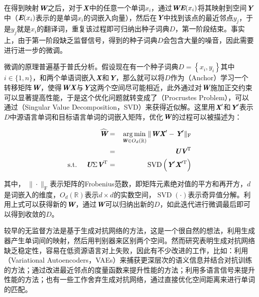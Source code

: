\parinterval 在得到映射$\textbf{\em W}$之后，对于$\textbf{\em X}$中的任意一个单词$x_{i}$，通过$\textbf{\em W} \textbf{\em E}({x}_{i})$将其映射到空间$\textbf{\em Y}$中（$\textbf{\em E}({x}_{i})$表示的是单词$x_{i}$的词嵌入向量），然后在$\textbf{\em Y}$中找到该点的最近邻点$y_{j}$，于是$y_{j}$就是$x_{i}$的翻译词，重复该过程即可归纳出种子词典$D$，第一阶段结束。事实上，由于第一阶段缺乏监督信号，得到的种子词典$D$会包含大量的噪音，因此需要进行进一步的微调。

\parinterval 微调的原理普遍基于普氏分析。假设现在有一个种子词典$D=\left\{x_{i}, y_{i}\right\}$其中${i \in\{1, n\}}$，和两个单语词嵌入$\textbf{\em X}$和$\textbf{\em Y}$，那么就可以将$D$作为{\small{}}（Anchor）学习一个转移矩阵$\textbf{\em W}$，使得$\textbf{\em W} \textbf{\em X}$与$\textbf{\em Y}$这两个空间尽可能相近，此外通过对$\textbf{\em W}$施加正交约束可以显著提高性能，于是这个优化问题就转变成了{\small{}}（Procrustes Problem），可以通过{\small{}}（Singular Value Decomposition，SVD）来获得近似解。这里用$\textbf{\em X}'$和$\textbf{\em Y}'$表示$D$中源语言单词和目标语言单词的词嵌入矩阵，优化$\textbf{\em W}$的过程可以被描述为：

\begin{eqnarray}
\widehat{\textbf{\em W}} & = & \operatorname*{arg\,min}_{\textbf{\em W} \in O_{d}(\mathbb{R})}{\|\textbf{\em W} \textbf{\em X}'- \textbf{\em Y}' \|_{\mathrm{F}}} \nonumber \\
                              & = & \textbf{\em U} \textbf{\em V}^{\rm{T}} \\ \label{eq:16-9}
\textrm{s.t.\ \ \ \ } \textbf{\em U} \Sigma \textbf{\em V}^{\rm{T}} &= &\operatorname{SVD}\left(\textbf{\em Y}' \textbf{\em X}'^{\rm{T}}\right)
\label{eq:16-10}
\end{eqnarray}

\noindent 其中， $\|\cdot\|_{\mathrm{F}}$表示矩阵的Frobenius范数，即矩阵元素绝对值的平方和再开方，$d$是词嵌入的维度，$O_d(\mathbb{R})$表示$d\times d$的实数空间，$\operatorname{SVD}(\cdot)$表示奇异值分解。利用上式可以获得新的$\textbf{\em W}$，通过$\textbf{\em W}$可以归纳出新的$D$，如此迭代进行微调最后即可以得到收敛的$D$。

\parinterval 较早的无监督方法是基于生成对抗网络的方法，这是一个很自然的想法，利用生成器产生单词间的映射，然后用判别器来区别两个空间。然而研究表明生成对抗网络缺乏稳定性，容易在低资源语言对上失败，因此有不少改进的工作，比如：利用{\small{}}（Variational Autoencoders，VAEs）来捕获更深层次的语义信息并结合对抗训练的方法；通过改进最近邻点的度量函数来提升性能的方法；利用多语言信号来提升性能的方法；也有一些工作舍弃生成对抗网络，通过直接优化空间距离来进行单词的匹配。

